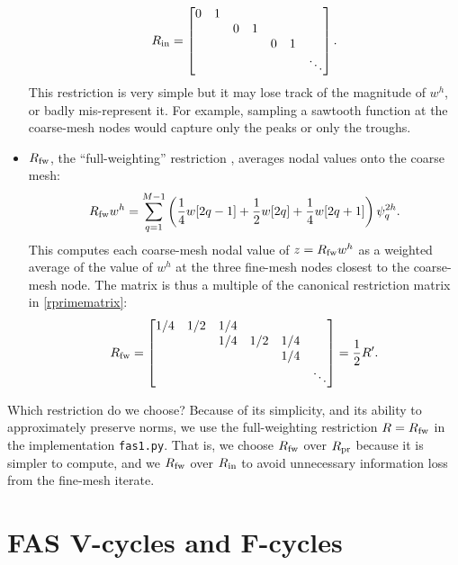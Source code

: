 \documentclass[letterpaper,final,12pt,reqno]{amsart}
\begin{document}
\begin{itemize}
\begin{equation}
R_{\text{in}} = \begin{bmatrix}
0 & 1 &   &   &   &   &\\
  &   & 0 & 1 &   &   & \\
  &   &   &   & 0 & 1 & \\
  &   &   &   &   &   & \ddots
\end{bmatrix}. \label{rinmatrix}
\end{equation}
This restriction is very simple but it may lose track of the magnitude of $w^h$, or badly mis-represent it.  For example, sampling a sawtooth function at the coarse-mesh nodes would capture only the peaks or only the troughs.
\item $R_{\text{fw}}$, the ``full-weighting'' restriction \cite{Briggsetal2000}, averages nodal values onto the coarse mesh:
\begin{equation}
  R_{\text{fw}} w^h = \sum_{q=1}^{M-1} \left(\frac{1}{4} w[2q-1] + \frac{1}{2} w[2q] + \frac{1}{4} w[2q+1]\right) \psi_q^{2h}. \label{rfwdefinition}
\end{equation}
This computes each coarse-mesh nodal value of $z=R_{\text{fw}} w^h$ as a weighted average of the value of $w^h$ at the three fine-mesh nodes closest to the coarse-mesh node.  The matrix is thus a multiple of the canonical restriction matrix in \eqref{rprimematrix}:
\begin{equation}
R_{\text{fw}} = \begin{bmatrix}
1/4 & 1/2 & 1/4 &     &     &  \\
    &     & 1/4 & 1/2 & 1/4 &  \\
    &     &     &     & 1/4 &  \\
    &     &     &     &     & \ddots
\end{bmatrix} = \frac{1}{2} R'. \label{rfwmatrix}
\end{equation}
\end{itemize}

\medskip
Which restriction do we choose?  Because of its simplicity, and its ability to approximately preserve norms, we use the full-weighting restriction $R=R_{\text{fw}}$ in the implementation \texttt{fas1.py}.  That is, we choose $R_{\text{fw}}$ over $R_{\text{pr}}$ because it is simpler to compute, and we $R_{\text{fw}}$ over $R_{\text{in}}$ to avoid unnecessary information loss from the fine-mesh iterate.


\section{FAS V-cycles and F-cycles} \label{sec:fascycles}
\end{document}
